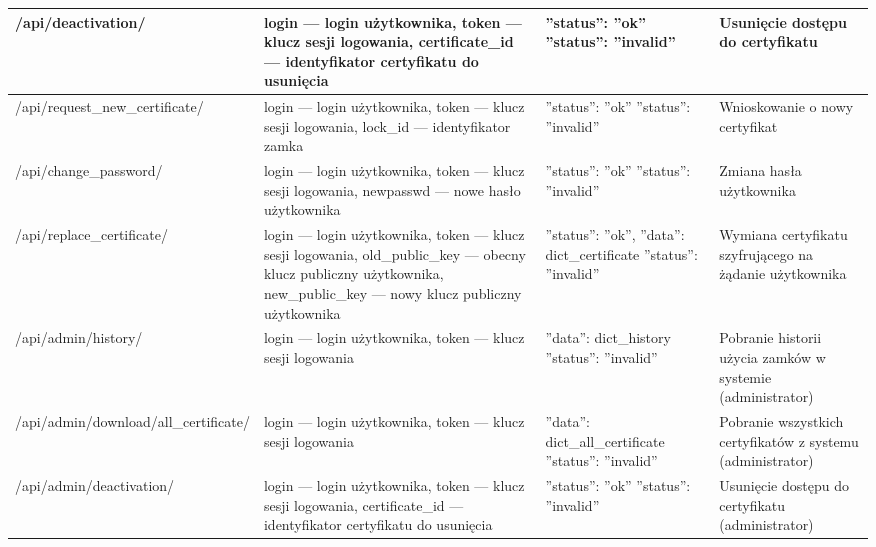 \begin{landscape}
\begin{longtable}[!ht]{|m{5cm}|m{5cm}|m{4.7cm}|m{4cm}|}
		/api/deactivation/ & login --- login użytkownika, \newline token --- klucz sesji logowania, \newline certificate\_id --- identyfikator certyfikatu do usunięcia & ''status'': ''ok'' \tablinia ''status'': ''invalid'' & Usunięcie dostępu do certyfikatu \\ \hline
		/api/request\_new\_certificate/ & login --- login użytkownika, \newline token --- klucz sesji logowania, \newline lock\_id --- identyfikator zamka & ''status'': ''ok'' \tablinia ''status'': ''invalid'' & Wnioskowanie o nowy certyfikat \\ \hline
		/api/change\_password/ & login --- login użytkownika, \newline token --- klucz sesji logowania, \newline newpasswd --- nowe hasło użytkownika & ''status'': ''ok'' \tablinia ''status'': ''invalid'' & Zmiana hasła użytkownika \\ \hline
		/api/replace\_certificate/ & login --- login użytkownika, \newline token --- klucz sesji logowania, \newline old\_public\_key --- obecny klucz publiczny użytkownika, \newline new\_public\_key --- nowy klucz publiczny użytkownika & ''status'': ''ok'', \newline ''data'': dict\_certificate \tablinia ''status'': ''invalid'' & Wymiana certyfikatu szyfrującego na żądanie użytkownika \\ \hline
		\newpage
		\hline
		/api/admin/history/ & login --- login użytkownika, \newline token --- klucz sesji logowania & ''data'': dict\_history \tablinia ''status'': ''invalid'' & Pobranie historii użycia zamków w systemie (administrator) \\ \hline
		/api/admin/download/\linebreak all\_certificate/ & login --- login użytkownika, \newline token --- klucz sesji logowania & ''data'': dict\_all\_certificate \tablinia ''status'': ''invalid'' & Pobranie wszystkich certyfikatów z systemu (administrator)\\ \hline
		/api/admin/deactivation/ & login --- login użytkownika, \newline token --- klucz sesji logowania, \newline certificate\_id --- identyfikator certyfikatu do usunięcia & ''status'': ''ok'' \tablinia ''status'': ''invalid'' & Usunięcie dostępu do certyfikatu (administrator) \\ \hline

\end{longtable}
\end{landscape}
